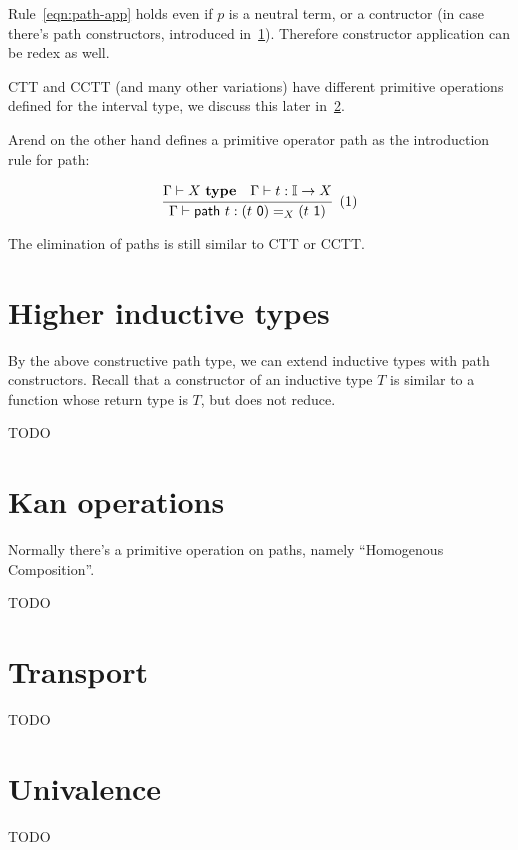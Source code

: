 \documentclass{article}
\newcommand{\TODO}[0]{{\color{red} TODO}}
\newcommand\xtag{
\refstepcounter{equation}%
\;\;\text{(\theequation)}}
\begin{document}
Rule~\ref{eqn:path-app} holds even if $p$ is a neutral term,
or a contructor (in case there's path constructors,
introduced in~\cref{sec:hit}).
Therefore constructor application can be redex as well.

CTT and CCTT (and many other variations) have different primitive
operations defined for the interval type,
we discuss this later in~\cref{sec:kan}.

Arend on the other hand defines a primitive operator \textsf{path}
as the introduction rule for path:

\[
  \cfrac{
    \Gamma \vdash X \ \textbf{type}
    \quad
    \Gamma \vdash t : \mathbb I \rightarrow X
  }{
    \Gamma \vdash \textsf{path} \ t : (t \ \textsf 0) =_X (t \ \textsf 1)
  }
  \xtag
\]

The elimination of paths is still similar to CTT or CCTT.

\section{Higher inductive types}
\label{sec:hit}

By the above constructive path type,
we can extend inductive types with path constructors.
Recall that a constructor of an inductive type $T$ is
similar to a function whose return type is $T$,
but does not reduce.

\TODO

\section{Kan operations}
\label{sec:kan}

Normally there's a primitive operation on paths,
namely ``Homogenous Composition''.

\TODO

\section{Transport}
\label{sec:coe}

\TODO

\section{Univalence}
\label{sec:ua}

\TODO



\end{document}
